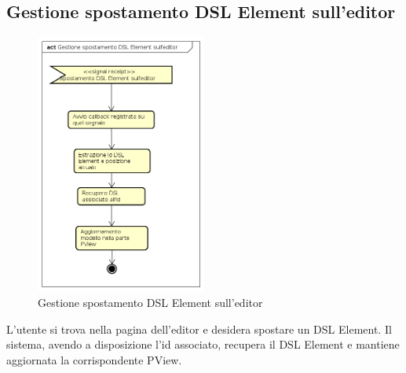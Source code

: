     \subsection{Gestione spostamento DSL Element sull'editor}
    \begin{figure}[H]
      \centering
      \includegraphics[width=0.5\textwidth]{res/img/spostamentoDSLElement.png}
      \caption{Gestione spostamento DSL Element sull'editor}
      \label{fig:diagram_model}
    \end{figure}
    L'utente si trova nella pagina dell'editor e desidera spostare un DSL Element. Il sistema, avendo a disposizione l'id associato, recupera il DSL Element e mantiene aggiornata la corrispondente PView.
